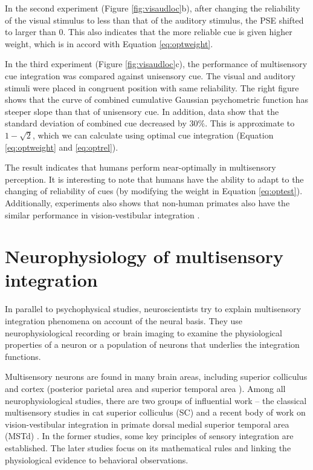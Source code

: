 \documentclass{article}[11pt]
\begin{document}
In the second experiment (Figure \ref{fig:visaudloc}b), after changing the reliability of the visual stimulus to less than that of the auditory stimulus, the PSE shifted to larger than 0. This also indicates that the more reliable cue is given higher weight, which is in accord with Equation \ref{eq:optweight}.

In the third experiment (Figure \ref{fig:visaudloc}c), the performance of multisensory cue integration was compared against unisensory cue. The visual and auditory stimuli were placed in congruent position with same reliability. The right figure shows that the curve of combined cumulative Gaussian psychometric function has steeper slope than that of unisensory cue. In addition, data show that the standard deviation of combined cue decreased by $30\%$. This is approximate to $1-\sqrt{2}$, which we can calculate using optimal cue integration (Equation \ref{eq:optweight} and \ref{eq:optrel}).

The result indicates that humans perform near-optimally in multisensory perception. It is interesting to note that humans have the ability to adapt to the changing of reliability of cues (by modifying the weight in Equation \ref{eq:optest}). Additionally, experiments also shows that non-human primates also have the similar performance in vision-vestibular integration \cite{gu_neural_2008}.

\section{Neurophysiology of multisensory integration}
In parallel to psychophysical studies, neuroscientists try to explain multisensory integration phenomena on account of the neural basis.
They use neurophysiological recording or brain imaging to examine the physiological properties of a neuron or a population of neurons that underlies the integration functions.


Multisensory neurons are found in many brain areas, including superior colliculus \cite{stein_merging_1993} and cortex (posterior parietal area \cite{graziano_system_2001} and superior temporal area \cite{alais_multisensory_2010}).
Among all neurophysiological studies, there are two groups of influential work -- the classical multisensory studies in cat superior colliculus (SC) \cite{stein_merging_1993, stein_multisensory_2008} and a recent body of work on vision-vestibular integration in primate dorsal medial superior temporal area (MSTd) \cite{morgan_multisensory_2008, fetsch_visualvestibular_2010}.
In the former studies, some key principles of sensory integration are established. The later studies focus on its mathematical rules and linking the physiological evidence to behavioral observations.
\end{document}
